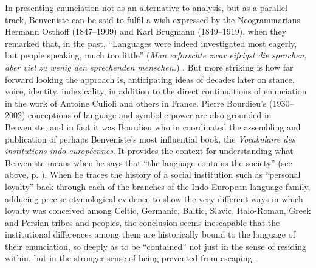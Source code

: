 \documentclass[output=paper]{langscibook}
\begin{document}
In presenting enunciation not as an alternative to  analysis, but as a parallel track, Benveniste can be said to fulfil a wish expressed by the Neogrammarians Hermann Osthoff (1847--1909) and Karl Brugmann (1849--1919), when they remarked that, in the past, ``Languages were indeed investigated most eagerly, but people speaking, much too little'' (\emph{Man erforschte zwar eifrigst die \emph{spra\-chen}, aber viel zu wenig \emph{den sprechenden menschen}.}) \citep[iii]{OsthoffBrugmann1878}. But more striking is how far forward looking the approach is, anticipating ideas of decades later on stance, voice, identity, indexicality, in addition to the direct continuations of enunciation in the work of Antoine Culioli and others in France. Pierre Bourdieu's (1930--2002) conceptions of language and symbolic power are also grounded in Benveniste, and in fact it was Bourdieu who in \citeyear{Benveniste1969vocabulaire} coordinated the assembling and publication of perhaps Benveniste's most influential book, the \emph{Vocabulaire des institutions indo-européennes}. It provides the context for understanding what Benveniste means when he says that ``the language contains the society'' (see above, p. \pageref{q:joseph:langcontainssoc}). When he traces the history of a social institution such as ``personal loyalty'' back through each of the branches of the Indo-European language family, adducing precise etymological evidence to show the very different ways in which loyalty was conceived among Celtic, Germanic, Baltic, Slavic, Italo-Roman, Greek and Persian tribes and peoples, the conclusion seems inescapable that the institutional differences among them are historically bound to the language of their enunciation, so deeply as to be ``contained'' not just in the sense of residing within, but in the stronger sense of being prevented from escaping.
\end{document}
